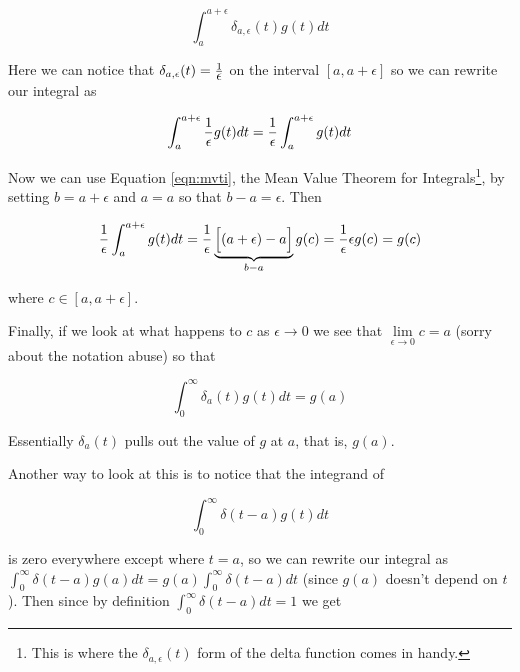 \documentclass{article}
\theoremstyle{definition}
\begin{document}
\begin{equation*}
  \int_{a}^{a + \epsilon} \delta_{a,\epsilon}(t) g(t) dt
\end{equation*}

\bigskip
\noindent
Here we can notice that $ \delta_{a,\epsilon}(t) = \frac{1}{\mathlarger{\epsilon}}$ on the interval $[a, a+\epsilon]$ so we can rewrite our integral as 

\bigskip
\begin{equation*}
  \int_{a}^{a + \epsilon} \frac{1}{\mathlarger{\epsilon}} g(t) dt =  \frac{1}{\mathlarger{\epsilon}} \int_{a}^{a + \epsilon} g(t) dt
\end{equation*}

\bigskip
\noindent
Now we can use Equation \ref{eqn:mvti}, the Mean Value Theorem for Integrals\footnote{This is where the $\delta_{a,\epsilon}(t)$ form of the delta function comes in handy.},
by setting $b = a + \epsilon$ and $a = a$ so that $b - a = \epsilon$. Then 

\bigskip
\begin{equation*}
 \frac{1}{\mathlarger{\epsilon}} \int_{a}^{a + \epsilon} g(t) dt =  \frac{1}{\mathlarger{\epsilon}} \underbrace{ \Big [(a + \epsilon) - a \Big]}_{b -a} g(c) = \frac{1}{\mathlarger{\epsilon}} \epsilon g(c) = g(c)
\end{equation*}

\bigskip
\noindent
where $c \in [a, a + \epsilon]$. 

\bigskip
\noindent
Finally, if we look at what happens to $c$ as $\epsilon \to 0$ we see that $\lim\limits_{\epsilon \to 0} c = a$ (sorry about the notation abuse)
so that 

\begin{equation}
  \int_{0}^{\infty} \delta_{a}(t) g(t) dt = g(a)
  \label{eqn:g(a)}
\end{equation}

\bigskip
\noindent
Essentially $\delta_{a}(t)$ pulls out the value of $g$ at $a$, that is, $g(a)$.

\bigskip
\noindent
Another way to look at this \cite{youtube:suskind2008.4} is to notice that the integrand of 

\bigskip
\begin{equation*}
  \int_{0}^{\infty} \delta (t-a) g(t) dt
\end{equation*}

\bigskip
\noindent
is zero everywhere except where $t = a$, so we can rewrite our integral as
 $\int_{0}^{\infty} \delta (t-a) g(a) dt = g(a) \int_{0}^{\infty} \delta (t-a) dt$ (since $g(a)$ doesn't depend on $t$). 
 Then since by definition $ \int_{0}^{\infty} \delta (t-a) dt = 1$ we get
\end{document}
